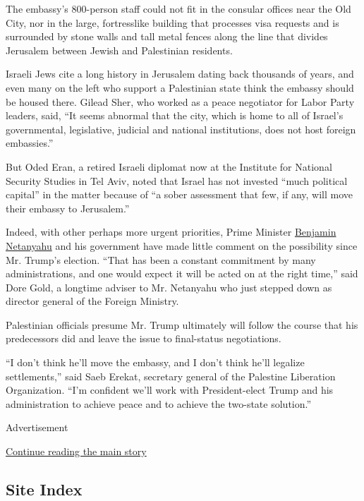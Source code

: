 The embassy's 800-person staff could not fit in the consular offices
near the Old City, nor in the large, fortresslike building that
processes visa requests and is surrounded by stone walls and tall metal
fences along the line that divides Jerusalem between Jewish and
Palestinian residents.

Israeli Jews cite a long history in Jerusalem dating back thousands of
years, and even many on the left who support a Palestinian state think
the embassy should be housed there. Gilead Sher, who worked as a peace
negotiator for Labor Party leaders, said, ``It seems abnormal that the
city, which is home to all of Israel's governmental, legislative,
judicial and national institutions, does not host foreign embassies.''

But Oded Eran, a retired Israeli diplomat now at the Institute for
National Security Studies in Tel Aviv, noted that Israel has not
invested ``much political capital'' in the matter because of ``a sober
assessment that few, if any, will move their embassy to Jerusalem.''

Indeed, with other perhaps more urgent priorities, Prime Minister
\href{http://www.nytimes3xbfgragh.onion/topic/person/benjamin-netanyahu?inline=nyt-per}{Benjamin
Netanyahu} and his government have made little comment on the
possibility since Mr. Trump's election. ``That has been a constant
commitment by many administrations, and one would expect it will be
acted on at the right time,'' said Dore Gold, a longtime adviser to Mr.
Netanyahu who just stepped down as director general of the Foreign
Ministry.

Palestinian officials presume Mr. Trump ultimately will follow the
course that his predecessors did and leave the issue to final-status
negotiations.

``I don't think he'll move the embassy, and I don't think he'll legalize
settlements,'' said Saeb Erekat, secretary general of the Palestine
Liberation Organization. ``I'm confident we'll work with President-elect
Trump and his administration to achieve peace and to achieve the
two-state solution.''

Advertisement

\protect\hyperlink{after-bottom}{Continue reading the main story}

\hypertarget{site-index}{%
\subsection{Site Index}\label{site-index}}

